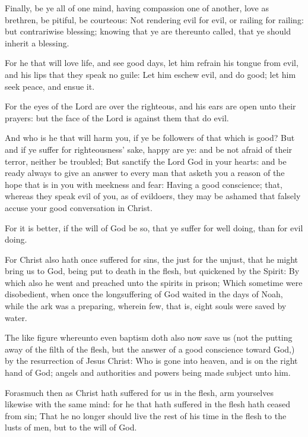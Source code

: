 \Verse Finally, be ye all of one mind, having compassion one of another, love as brethren, be pitiful, be courteous: \Verse Not rendering evil for evil, or railing for railing: but contrariwise blessing; knowing that ye are thereunto called, that ye should inherit a blessing.

\Verse For he that will love life, and see good days, let him refrain his tongue from evil, and his lips that they speak no guile: \Verse Let him eschew evil, and do good; let him seek peace, and ensue it.

\Verse For the eyes of the Lord are over the righteous, and his ears are open unto their prayers: but the face of the Lord is against them that do evil.

\Verse And who is he that will harm you, if ye be followers of that which is good?  \Verse But and if ye suffer for righteousness' sake, happy are ye: and be not afraid of their terror, neither be troubled; \Verse But sanctify the Lord God in your hearts: and be ready always to give an answer to every man that asketh you a reason of the hope that is in you with meekness and fear: \Verse Having a good conscience; that, whereas they speak evil of you, as of evildoers, they may be ashamed that falsely accuse your good conversation in Christ.

\Verse For it is better, if the will of God be so, that ye suffer for well doing, than for evil doing.

\Verse For Christ also hath once suffered for sins, the just for the unjust, that he might bring us to God, being put to death in the flesh, but quickened by the Spirit: \Verse By which also he went and preached unto the spirits in prison; \Verse Which sometime were disobedient, when once the longsuffering of God waited in the days of Noah, while the ark was a preparing, wherein few, that is, eight souls were saved by water.

\Verse The like figure whereunto even baptism doth also now save us (not the putting away of the filth of the flesh, but the answer of a good conscience toward God,) by the resurrection of Jesus Christ: \Verse Who is gone into heaven, and is on the right hand of God; angels and authorities and powers being made subject unto him.


\Chapter
\Verse Forasmuch then as Christ hath suffered for us in the flesh, arm yourselves likewise with the same mind: for he that hath suffered in the flesh hath ceased from sin; \Verse That he no longer should live the rest of his time in the flesh to the lusts of men, but to the will of God.

